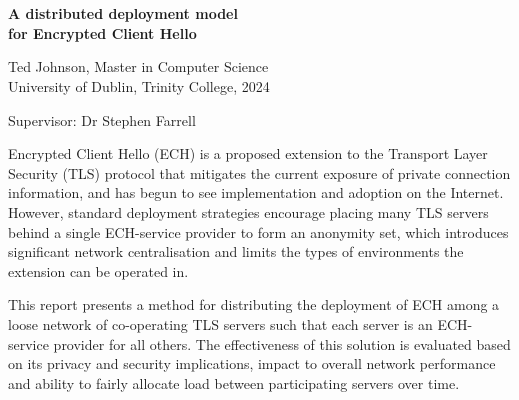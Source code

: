 \chapter*{}
\thispagestyle{empty}

\vspace*{0mm}
\begin{center}
\setlength{\unitlength}{1mm}

\begin{spacing}{2}
\textbf{\Large A distributed deployment model \\ for Encrypted Client Hello} \\[10mm]
\end{spacing}

\begin{spacing}{1.5}
Ted Johnson, Master in Computer Science \\
University of Dublin, Trinity College, 2024 \\[10mm]
\end{spacing}

Supervisor: Dr Stephen Farrell \\
\end{center}
\vspace{5mm}

\begin{spacing}{1} \noindent
Encrypted Client Hello (ECH) is a proposed extension to the Transport Layer Security (TLS) protocol that mitigates the current exposure of private connection information, and has begun to see implementation and adoption on the Internet. However, standard deployment strategies encourage placing many TLS servers behind a single ECH-service provider to form an anonymity set, which introduces significant network centralisation and limits the types of environments the extension can be operated in.

This report presents a method for distributing the deployment of ECH among a loose network of co-operating TLS servers such that each server is an ECH-service provider for all others. The effectiveness of this solution is evaluated based on its privacy and security implications, impact to overall network performance and ability to fairly allocate load between participating servers over time.


\end{spacing}
